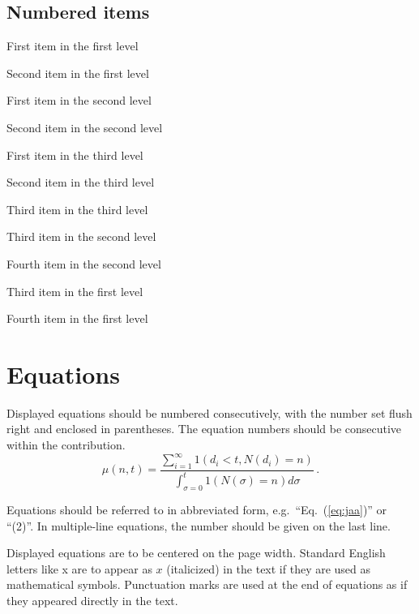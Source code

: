 \documentclass{ws-ijprai}
\begin{document}
\subsection*{Numbered items}

\begin{arabiclist}
\item First item in the first level
\item Second item in the first level
\begin{alphlist}[(a)]
\item First item in the second level
\item Second item in the second level
\begin{romanlist}[iii.]
\item First item in the third level
\item Second item in the third level
\item Third item in the third level
\end{romanlist}
\item Third item in the second level
\item Fourth item in the second level
\end{alphlist}
\item Third item in the first level
\item Fourth item in the first level
\end{arabiclist}

\section{Equations}
Displayed equations should be numbered consecutively, with the number set flush right and enclosed in parentheses. The equation numbers should be consecutive within the contribution.
\begin{equation}
\mu(n, t) = \frac{\sum^\infty_{i=1} 1(d_i < t, N(d_i)
= n)}{\int^t_{\sigma=0} 1(N(\sigma) = n)d\sigma}\,.
\label{eq:jaa}
\end{equation}

Equations should be referred to in abbreviated form, e.g.~``Eq.~(\ref{eq:jaa})'' or ``(2)''. In multiple-line equations, the number should be given on the last line.

Displayed equations are to be centered on the page width.  Standard English letters like x are to appear as $x$ (italicized) in the text if they are used as mathematical symbols. Punctuation marks are used at the end of equations as if they appeared directly in the text.
\end{document}
